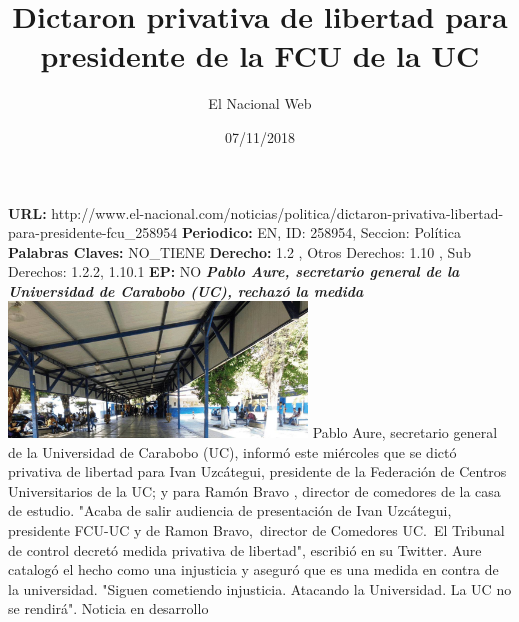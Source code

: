 \documentclass{article}%
\title{\textbf{Dictaron privativa de libertad para presidente de la FCU de la UC}}%
\author{El Nacional Web}%
\date{07/11/2018}%
\begin{document}
%
\normalsize%
\maketitle%
\textbf{URL: }%
http://www.el{-}nacional.com/noticias/politica/dictaron{-}privativa{-}libertad{-}para{-}presidente{-}fcu\_258954\newline%
%
\textbf{Periodico: }%
EN, %
ID: %
258954, %
Seccion: %
Política\newline%
%
\textbf{Palabras Claves: }%
NO\_TIENE\newline%
%
\textbf{Derecho: }%
1.2%
, Otros Derechos: %
1.10%
, Sub Derechos: %
1.2.2, 1.10.1%
\newline%
%
\textbf{EP: }%
NO\newline%
\newline%
%
\textbf{\textit{Pablo Aure, secretario general de la Universidad de Carabobo (UC), rechazó la medida}}%
\newline%
\newline%
%
\includegraphics[width=300px]{36.jpg}%
\newline%
%
Pablo Aure, secretario general de la Universidad de Carabobo (UC), informó este miércoles que se dictó privativa de libertad para Ivan Uzcátegui, presidente de la Federación de Centros Universitarios de la UC; y para Ramón Bravo , director de comedores de la casa de estudio.%
\newline%
%
"Acaba de salir audiencia de presentación de Ivan Uzcátegui, presidente FCU{-}UC y de Ramon Bravo,~director de Comedores UC.~El Tribunal de control decretó medida privativa de libertad", escribió en su Twitter.%
\newline%
%
Aure catalogó el hecho como una injusticia y aseguró que es una medida en contra de la universidad. "Siguen cometiendo injusticia. Atacando la Universidad. La UC no se rendirá".%
\newline%
%
Noticia en desarrollo%
\newline%
%
\end{document}
